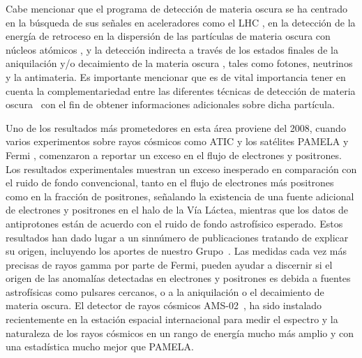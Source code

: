 Cabe mencionar que el programa de detección de materia oscura se ha
centrado en la búsqueda de sus señales en aceleradores como el LHC
\cite{Baltz:2006fm,Cho:2008tj,Nath:2010zj}, en la detección de la
energía de retroceso en la dispersión de las partículas de materia
oscura con núcleos atómicos
\cite{Green:2007rb,Bertone:2007xj,Drees:2008bv,Green:2008rd}, y la
detección indirecta a través de los estados finales de la aniquilación
y/o decaimiento de la materia oscura
\cite{Eichler:1989br,Bertone:2007aw,Arvanitaki:2008hq,Ibarra:2008jk,Ibarra:2008qg,Buckley:2009kw,Ibarra:2009tn,Ruderman:2009ta,Bernal:2010ip,Bernal:2011pz,Das:2011yr},
tales como fotones, neutrinos y la antimateria.
Es importante mencionar que es de vital importancia tener en cuenta
la complementariedad entre las diferentes técnicas de detección
de materia oscura~\cite{Bernal:2008zk,Beltran:2008xg} con el fin de obtener
informaciones adicionales sobre dicha partícula.

Uno de los resultados más prometedores en esta área proviene del 2008, cuando
varios experimentos sobre rayos cósmicos como ATIC \cite{:2008zzr} y
los satélites PAMELA \cite{Adriani:2008zr} y Fermi
\cite{Abdo:2009zk}, comenzaron a reportar un exceso en el flujo de
electrones y positrones.
%
Los resultados experimentales muestran un exceso
inesperado en comparación con el ruido de fondo convencional, tanto en el
flujo de electrones más positrones como en la fracción de positrones,
señalando la existencia de una fuente adicional de electrones y
positrones en el halo de la Vía Láctea, mientras que los datos de
antiprotones están de acuerdo con el ruido de fondo astrofísico esperado. 
%
Estos resultados han dado lugar a un sinnúmero de publicaciones
tratando de explicar su origen, incluyendo los aportes de nuestro
Grupo~\cite{Beltran:2008xg,Nardi:2008ix,Grajek:2008pg,Barger:2009yt,
Meade:2009iu,Ibarra:2009dr,Sierra:2009zq}. Las medidas cada vez más
precisas de rayos gamma por parte de Fermi, pueden ayudar a discernir
si el origen de las anomalías detectadas en electrones y positrones es
debida a fuentes astrofísicas como pulsares cercanos, o a la
aniquilación o el decaimiento de materia oscura.
%
El detector de rayos cósmicos AMS-02~\cite{ams:2009}, ha sido
instalado recientemente en la estación espacial internacional para
medir el espectro y la naturaleza de los rayos cósmicos en un rango de energía
mucho más amplio y con una estadística mucho mejor que PAMELA.

